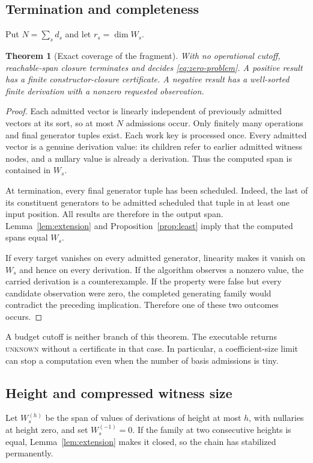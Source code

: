 \documentclass[11pt,letterpaper]{article}
\newtheorem{theorem}{Theorem}[section]
\theoremstyle{definition}\newtheorem{definition}[theorem]{Definition}
\theoremstyle{remark}\newtheorem{remark}[theorem]{Remark}
\newcommand{\unknown}{\textsc{unknown}}
\begin{document}
\subsection{Termination and completeness}
Put $N=\sum_s d_s$ and let $r_s=\dim W_s$.

\begin{theorem}[Exact coverage of the fragment]\label{thm:complete}
With no operational cutoff, reachable-span closure terminates and decides \eqref{eq:zero-problem}. A positive result has a finite constructor-closure certificate. A negative result has a well-sorted finite derivation with a nonzero requested observation.
\end{theorem}
\begin{proof}
Each admitted vector is linearly independent of previously admitted vectors at its sort, so at most $N$ admissions occur. Only finitely many operations and final generator tuples exist. Each work key is processed once. Every admitted vector is a genuine derivation value: its children refer to earlier admitted witness nodes, and a nullary value is already a derivation. Thus the computed span is contained in $W_s$.

At termination, every final generator tuple has been scheduled. Indeed, the last of its constituent generators to be admitted scheduled that tuple in at least one input position. All results are therefore in the output span. Lemma~\ref{lem:extension} and Proposition~\ref{prop:least} imply that the computed spans equal $W_s$.

If every target vanishes on every admitted generator, linearity makes it vanish on $W_s$ and hence on every derivation. If the algorithm observes a nonzero value, the carried derivation is a counterexample. If the property were false but every candidate observation were zero, the completed generating family would contradict the preceding implication. Therefore one of these two outcomes occurs.
\end{proof}

A budget cutoff is neither branch of this theorem. The executable returns \unknown{} without a certificate in that case. In particular, a coefficient-size limit can stop a computation even when the number of basis admissions is tiny.

\subsection{Height and compressed witness size}
Let $W_s^{(h)}$ be the span of values of derivations of height at most $h$, with nullaries at height zero, and set $W_s^{(-1)}=0$. If the family at two consecutive heights is equal, Lemma~\ref{lem:extension} makes it closed, so the chain has stabilized permanently.
\end{document}

